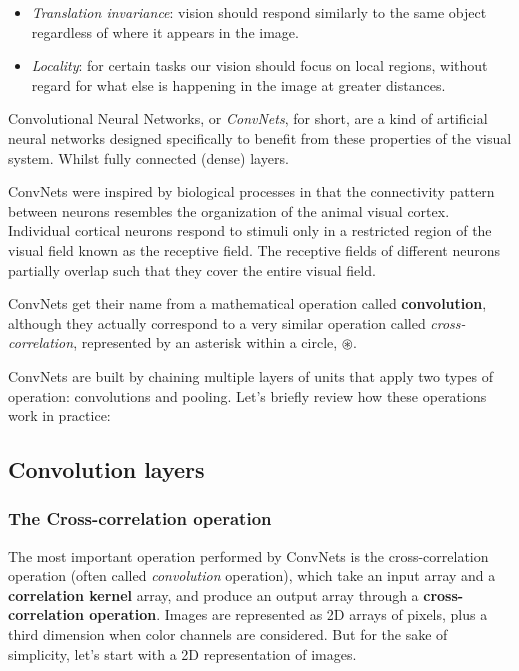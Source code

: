 \begin{itemize}
    \item \textit{Translation invariance}: vision should respond similarly to the same object regardless of where it appears in the image.
    \item \textit{Locality}: for certain tasks our vision should focus on local regions, without regard for what else is happening in the image at greater distances.
\end{itemize}

Convolutional Neural Networks, or \textit{ConvNets}, for short, are a kind of artificial neural networks designed specifically to benefit  from these properties of the visual system. Whilst fully connected (dense) layers. 

ConvNets were inspired by biological processes in that the connectivity pattern between neurons resembles the organization of the animal visual cortex. Individual cortical neurons respond to stimuli only in a restricted region of the visual field known as the receptive field. The receptive fields of different neurons partially overlap such that they cover the entire visual field.

ConvNets get their name from a mathematical operation called \textbf{convolution}, although they actually correspond to a very similar operation called \textit{cross-correlation}, represented by an asterisk within a circle, $\circledast$. 

ConvNets are built by chaining multiple layers of units that apply two types of operation: convolutions and pooling. Let's briefly review how these operations work in practice:

\subsection{Convolution layers}\label{subsec:conv_layers}

\subsubsection{The Cross-correlation operation}

The most important operation performed by ConvNets is the cross-correlation operation (often called \textit{convolution} operation), which take an input array and a \textbf{correlation kernel} array, and produce an output array through a \textbf{cross-correlation operation}. Images are represented as 2D arrays of pixels, plus a third dimension when color channels are considered. But for the sake of simplicity, let's start with a 2D representation of images. 

